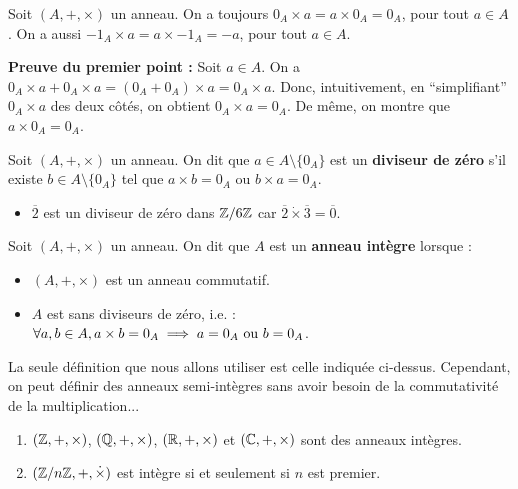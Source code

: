 \documentclass[12pt, a4paper]{report}
\begin{document}
\begin{remark}
    Soit $(A,+,\times)$ un anneau. On a toujours $0_A \times a = a \times 0_A = 0_A$, pour tout $a \in A$. On a aussi $-1_A \times a = a \times -1_A = -a$, pour tout $a \in A$.

    \textbf{Preuve du premier point :} Soit $a \in A$. On a $0_A \times a + 0_A \times a = (0_A + 0_A) \times a = 0_A \times a$. Donc, intuitivement, en ``simplifiant'' $0_A \times a$ des deux côtés, on obtient $0_A \times a = 0_A$. De même, on montre que $a \times 0_A = 0_A$.
\end{remark}

\begin{definition}
    Soit $(A,+,\times)$ un anneau. On dit que $a \in A\setminus\{0_A\}$ est un \textbf{diviseur de zéro} s'il existe $b \in A\setminus\{0_A\}$ tel que $a \times b = 0_A$ ou $b \times a = 0_A$.
\end{definition}

\begin{example}
    \begin{itemize}
        \item $\overline{2}$ est un diviseur de zéro dans $\mathbb{Z}/6\mathbb{Z}$ car $\overline{2} \dot\times \overline{3} = \overline{0}$.
    \end{itemize}
\end{example}

\begin{definition}
    Soit $(A,+,\times)$ un anneau. On dit que $A$ est un \textbf{anneau intègre} lorsque :
    \begin{itemize}
        \item $(A,+,\times)$ est un anneau commutatif.
        \item $A$ est sans diviseurs de zéro, i.e. : $\forall a,b \in A, a\times b = 0_A \implies a = 0_A \text{ ou } b = 0_A$.
    \end{itemize}
\end{definition}

\begin{remark}
    La seule définition que nous allons utiliser est celle indiquée ci-dessus. Cependant, on peut définir des anneaux semi-intègres sans avoir besoin de la commutativité de la multiplication...
\end{remark}

\begin{example}
    \begin{enumerate}
        \item $(\mathbb{Z},+,\times)$, $(\mathbb{Q},+,\times)$, $(\mathbb{R},+,\times)$ et $(\mathbb{C},+,\times)$ sont des anneaux intègres.
        \item $(\mathbb{Z}/n\mathbb{Z},+,\dot\times)$ est intègre si et seulement si $n$ est premier.
    \end{enumerate}
\end{example}
\end{document}
